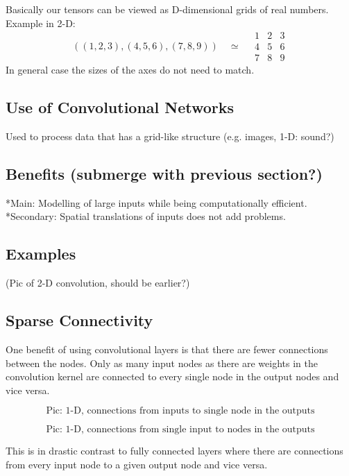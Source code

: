 \documentclass[]{article}
\begin{document}
Basically our tensors can be viewed as D-dimensional grids of real numbers.
Example in 2-D:
\[
((1, 2, 3), (4, 5, 6), (7, 8, 9)) \quad \simeq \quad
\begin{array}{c|c|c}
  1 & 2 & 3 \\
  \hline
  4 & 5 & 6 \\
  \hline
  7 & 8 & 9
 \end{array}
\]
In general case the sizes of the axes do not need to match.


\subsection{Use of Convolutional Networks}
Used to process data that has a grid-like structure (e.g. images, 1-D: sound?)

\subsection{Benefits (submerge with previous section?)}
*Main: Modelling of large inputs while being computationally efficient.\\
*Secondary: Spatial translations of inputs does not add problems.

\subsection{Examples}
(Pic of 2-D convolution, should be earlier?)

\subsection{Sparse Connectivity}
One benefit of using convolutional layers is that there are fewer connections
between the nodes. Only as many input nodes as there are weights in the
convolution kernel are connected to every single node in the output nodes and
vice versa.

\[
\text{Pic: 1-D, connections from inputs to single node in the outputs}
\]

\[
\text{Pic: 1-D, connections from single input to nodes in the outputs}
\]

This is in drastic contrast to fully connected layers where there are connections
from every input node to a given output node and vice versa.
\end{document}
